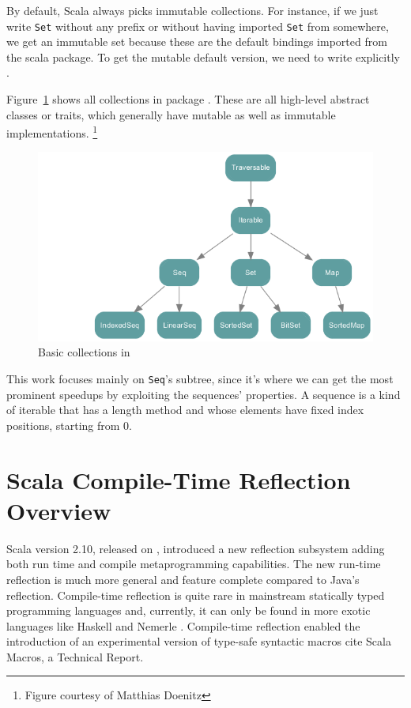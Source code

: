 By default, Scala always picks immutable collections. For instance, if we just
write \texttt{Set} without any prefix or without having imported \texttt{Set} from somewhere, we
get an immutable set because these are the default bindings imported from the scala
package. To get the mutable default version, we need to write explicitly
.

Figure~\ref{colls} shows all collections in package . These
are all high-level abstract classes or traits, which generally have mutable as
well as immutable implementations. \footnote{Figure courtesy of Matthias Doenitz}

\begin{figure}
\centering
\includegraphics{figures/colls.png}
\caption[All scala.collection collections]{Basic collections in 
}
\label{colls}
\end{figure}


This work focuses mainly on \texttt{Seq}'s subtree, since it's where we can get the
most prominent speedups by exploiting the sequences' properties. A sequence is a
kind of iterable that has a length method and whose elements have fixed index
positions, starting from 0.


\section{Scala Compile-Time Reflection Overview}

Scala version 2.10, released on , introduced a new reflection
subsystem adding both run time and compile metaprogramming capabilities. The new
run-time reflection is much more general and feature complete compared to Java's
reflection. Compile-time reflection is quite rare in mainstream statically typed
programming languages and, currently, it can only be found in more exotic
 languages like Haskell  and Nemerle .
 Compile-time reflection enabled the introduction of an experimental version of type-safe
 syntactic macros {cite Scala Macros, a Technical Report}. 

